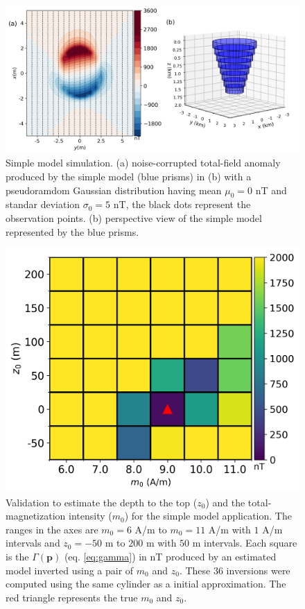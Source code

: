 \begin{figure}
    \centering
    \includegraphics[scale=.5]{figures/simple_model_data.png}
    \caption{Simple model simulation. (a) noise-corrupted total-field anomaly produced by the simple model (blue prisms) in (b) with a pseudoramdom Gaussian distribution having mean $\mu_0 = 0$ nT and standar deviation $\sigma_0 = 5$ nT, the black dots represent the observation points. (b) perspective view of the simple model represented by the blue prisms.
}
    \label{fig:simple_model}
\end{figure}

\begin{figure}
	\centering
	\includegraphics[scale=.75]{figures/simple_gamma.png}
	\caption{Validation to estimate the depth to the top ($ z_0 $) and the total-magnetization intensity ($ m_0 $) for the simple model application. The ranges in the axes are $m_0 = 6$ A/m to $m_0=11$ A/m with $1$ A/m intervals and $z_0=-50$ m to $200$ m with $50$ m intervals. Each square is the $\Gamma (\mathbf{p})$ (eq. \ref{eq:gamma}) in nT produced by an estimated model inverted using a pair of $m_0$ and $z_0$. These 36 inversions were computed using the same cylinder as a initial approximation. The red triangle represents the true $m_0$ and $z_0$.
	}
	\label{fig:simple_map}
\end{figure}

